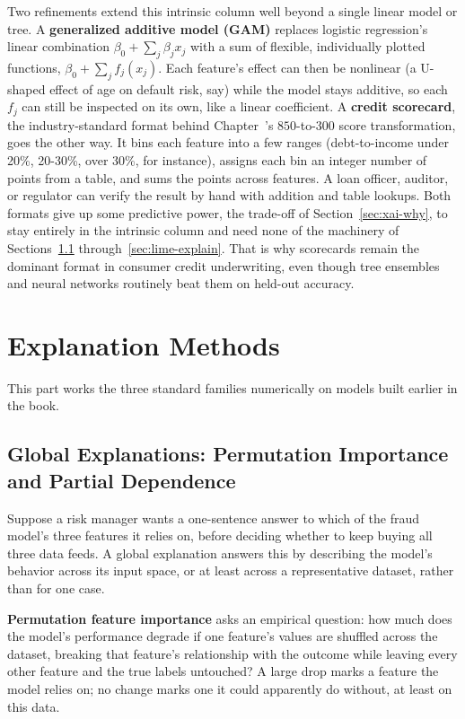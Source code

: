\documentclass[../ai_in_finance]{subfiles}
\begin{document}
Two refinements extend this intrinsic column well beyond a single linear model or tree. A \textbf{generalized additive model (GAM)} replaces logistic regression's linear combination $\beta_0 + \sum_j \beta_j x_j$ with a sum of flexible, individually plotted functions, $\beta_0 + \sum_j f_j(x_j)$. Each feature's effect can then be nonlinear (a U-shaped effect of age on default risk, say) while the model stays additive, so each $f_j$ can still be inspected on its own, like a linear coefficient. A \textbf{credit scorecard}, the industry-standard format behind Chapter~'s $850$-to-$300$ score transformation, goes the other way. It bins each feature into a few ranges (debt-to-income under 20\%, 20-30\%, over 30\%, for instance), assigns each bin an integer number of points from a table, and sums the points across features. A loan officer, auditor, or regulator can verify the result by hand with addition and table lookups. Both formats give up some predictive power, the trade-off of Section~\ref{sec:xai-why}, to stay entirely in the intrinsic column and need none of the machinery of Sections~\ref{sec:global-explain} through~\ref{sec:lime-explain}. That is why scorecards remain the dominant format in consumer credit underwriting, even though tree ensembles and neural networks routinely beat them on held-out accuracy.

\section{Explanation Methods}

This part works the three standard families numerically on models built earlier in the book.

\subsection{Global Explanations: Permutation Importance and Partial Dependence}
\label{sec:global-explain}

Suppose a risk manager wants a one-sentence answer to which of the fraud model's three features it relies on, before deciding whether to keep buying all three data feeds. A global explanation answers this by describing the model's behavior across its input space, or at least across a representative dataset, rather than for one case.

\textbf{Permutation feature importance} asks an empirical question: how much does the model's performance degrade if one feature's values are shuffled across the dataset, breaking that feature's relationship with the outcome while leaving every other feature and the true labels untouched? A large drop marks a feature the model relies on; no change marks one it could apparently do without, at least on this data.
\end{document}
